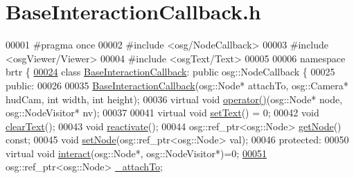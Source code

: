 \hypertarget{_base_interaction_callback_8h_source}{\section{Base\+Interaction\+Callback.\+h}
\label{_base_interaction_callback_8h_source}
}

\begin{DoxyCode}
00001 \textcolor{preprocessor}{#pragma once}
00002 \textcolor{preprocessor}{#include <osg/NodeCallback>}
00003 \textcolor{preprocessor}{#include <osgViewer/Viewer>}
00004 \textcolor{preprocessor}{#include <osgText/Text>}
00005 
00006 \textcolor{keyword}{namespace }brtr \{
\hypertarget{_base_interaction_callback_8h_source_l00024}{}\hyperlink{classbrtr_1_1_base_interaction_callback}{00024}     \textcolor{keyword}{class }\hyperlink{classbrtr_1_1_base_interaction_callback}{BaseInteractionCallback}: \textcolor{keyword}{public} osg::NodeCallback \{
00025     \textcolor{keyword}{public}:
00026 
00035         \hyperlink{classbrtr_1_1_base_interaction_callback_afc863306967933e0ebef5f7322fab06e}{BaseInteractionCallback}(osg::Node* attachTo, osg::Camera* hudCam, \textcolor{keywordtype}{int} width,
       \textcolor{keywordtype}{int} height);
00036         \textcolor{keyword}{virtual} \textcolor{keywordtype}{void} \hyperlink{classbrtr_1_1_base_interaction_callback_ab2cf0f22fcc9e79ecda29a547edb5084}{operator()}(osg::Node* node, osg::NodeVisitor* nv);
00037 
00041         \textcolor{keyword}{virtual} \textcolor{keywordtype}{void} \hyperlink{classbrtr_1_1_base_interaction_callback_a0fe57e329f044e21d49041c861435ad8}{setText}() = 0;
00042         \textcolor{keywordtype}{void} \hyperlink{classbrtr_1_1_base_interaction_callback_ad74fe9ac5d86c7f23d18614d5abb1003}{clearText}();
00043         \textcolor{keywordtype}{void} \hyperlink{classbrtr_1_1_base_interaction_callback_a95ede7c8aa0dc1e067ae64615ecb23db}{reactivate}();
00044         osg::ref\_ptr<osg::Node> \hyperlink{classbrtr_1_1_base_interaction_callback_aafca24ccde1cf21f4132f65a83e0b2bc}{getNode}() \textcolor{keyword}{const};
00045         \textcolor{keywordtype}{void} \hyperlink{classbrtr_1_1_base_interaction_callback_a420a1977c954850dbe66a189908cde80}{setNode}(osg::ref\_ptr<osg::Node> val);
00046     \textcolor{keyword}{protected}:
00050         \textcolor{keyword}{virtual} \textcolor{keywordtype}{void} \hyperlink{classbrtr_1_1_base_interaction_callback_a3ed50c9c1725f932e0b78c90ba24e1ed}{interact}(osg::Node*, osg::NodeVisitor*)=0;
\hypertarget{_base_interaction_callback_8h_source_l00051}{}\hyperlink{classbrtr_1_1_base_interaction_callback_a6666bae9f8f89ebbf75637c922ebfb54}{00051}         osg::ref\_ptr<osg::Node> \hyperlink{classbrtr_1_1_base_interaction_callback_a6666bae9f8f89ebbf75637c922ebfb54}{\_attachTo};

\end{DoxyCode}
